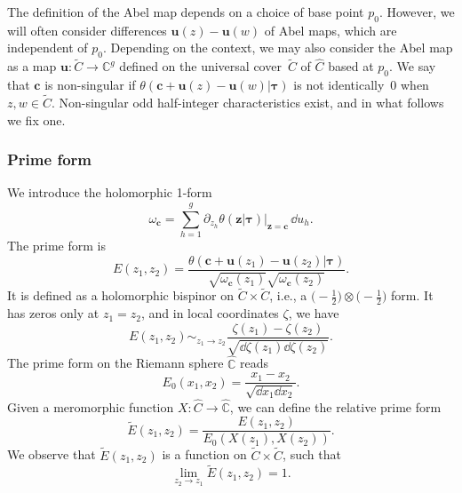 \documentclass[pdftex]{sigma}
\numberwithin{equation}{section}
\begin{document}
The definition of the Abel map depends on a choice of base point $p_{0}$.
However, we will often consider differences $\bm{u}(z) - \bm{u}(w)$ of Abel
maps, which are independent of $p_{0}$. Depending on the context, we may also consider the Abel map as a map $\bm{u} \colon \widetilde{C} \rightarrow \mathbb{C}^g$ defined on the universal cover~$\widetilde{C}$ of $\widehat{C}$ based at $p_0$. We say that $\boldsymbol{c}$ is non-singular if $\theta(\bm{c} + \bm{u}(z) - \bm{u}(w)|\bm{\tau})$ is not identically~$0$ when $z,w \in \widetilde{C}$. Non-singular odd half-integer characteristics exist, and in what follows we fix one. 


\subsubsection{Prime form}

We introduce the holomorphic 1-form
\begin{equation*}
 \omega_{\bm{c}} = \sum_{h=1}^{g}\partial_{z_{h}}\theta(\bm{z}|\bm{\tau})\big|_{\bm{z} = \bm{c}}\,\dd u_{h}.
\end{equation*}
The prime form is
\begin{equation}
\label{Eprimtheta}
E(z_1,z_2) = \frac{\theta(\bm{c} + \bm{u}(z_1) - \bm{u}(z_2)|\bm{\tau})}{\sqrt{\omega_{\bm{c}}(z_1)}\sqrt{\omega_{\bm{c}}(z_2)}}.
\end{equation}
It is defined as a holomorphic bispinor on $\widetilde{C} \times \widetilde{C}$, i.e., a $\bigl(-\frac{1}{2}\bigr) \otimes \bigl(-\frac{1}{2}\bigr)$ form. It has zeros only at $z_1 = z_2$, and in local coordinates $\zeta$, we have
\[
E(z_1,z_2) \mathop{\sim}_{z_1 \rightarrow z_2} \frac{\zeta(z_1) - \zeta(z_2)}{\sqrt{\dd \zeta(z_1) \dd \zeta(z_2)}}.
\]
The prime form on the Riemann sphere $\widehat{\mathbb{C}}$ reads
\[
E_0(x_1,x_2) = \frac{x_1 - x_2}{\sqrt{\dd x_1 \dd x_2}}.
\]
Given a meromorphic function $X \colon \widehat{C} \rightarrow \widehat{\mathbb{C}}$, we can define the relative prime form
\begin{equation*}
\tilde{E}(z_1,z_2) = \frac{E(z_1,z_2)}{E_0(X(z_1),X(z_2))}.
\end{equation*}
We observe that $\tilde{E}(z_1,z_2)$ is a function on $\widetilde{C} \times \widetilde{C}$, such that
\begin{equation}
\label{limEtilde} \lim_{z_2 \rightarrow z_1} \tilde{E}(z_1,z_2) = 1.
\end{equation}
\end{document}
